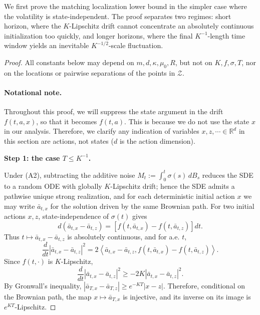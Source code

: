 \documentclass{article}
\newcommand{\1}{\mathbbm{1}}
\numberwithin{equation}{section}
\begin{document}
We first prove the matching localization lower bound in the simpler case where the volatility is state-independent. The proof separates two regimes: short horizon, where the \(K\)-Lipschitz drift cannot concentrate an absolutely continuous initialization too quickly, and longer horizons, where the final \(K^{-1}\)-length time window yields an inevitable \(K^{-1/2}\)-scale fluctuation.

\begin{proof}
All constants below may depend on $m,d,\kappa,\mu_0,R$, but not on
$K,f,\sigma,T$, nor on the locations or pairwise separations of the points
in $\mathcal{Z}$.

\paragraph{Notational note.} Throughout this proof, we will suppress the state argument in the drift $f(t, a, x)$, so that it becomes $f(t, a)$. This is because we do not use the state $x$ in our analysis. Therefore, we clarify any indication of variables $x, z,\cdots \in \mathbb{R}^{d}$ in this section are actions, not states ($d$ is the action dimension).

\medskip



\textbf{Step 1: the case \(T\le K^{-1}\).}

Under (A2), subtracting the additive noise
\(M_t:=\int_0^t \sigma(s)\,dB_s\) reduces the SDE to a random ODE with
globally \(K\)-Lipschitz drift; hence the SDE admits a pathwise unique
strong realization, and for each deterministic initial action \(x\) we may
write \(\bar a_{t,x}\) for the solution driven by the same Brownian path. For two
initial actions \(x,z\), state-independence of \(\sigma(t)\) gives
\[
d(\bar a_{t,x}-\bar a_{t,z})
=
\left[f(t,\bar a_{t,x})-f(t,\bar a_{t,z})\right]dt.
\]
Thus \(t\mapsto \bar a_{t,x}-\bar a_{t,z}\) is absolutely continuous, and
for a.e. \(t\),
\[
\frac{d}{dt}|\bar a_{t,x}-\bar a_{t,z}|^2
=
2\left\langle
\bar a_{t,x}-\bar a_{t,z},
f(t,\bar a_{t,x})-f(t,\bar a_{t,z})
\right\rangle.
\]
Since \(f(t,\cdot)\) is \(K\)-Lipschitz,
\[
\frac{d}{dt}|\bar a_{t,x}-\bar a_{t,z}|^2
\ge
-2K|\bar a_{t,x}-\bar a_{t,z}|^2 .
\]
By Gronwall's inequality,
$
|\bar a_{T,x}-\bar a_{T,z}|
\ge
e^{-KT}|x-z|.
$ Therefore, conditional on the Brownian path, the map
\(x\mapsto \bar a_{T,x}\) is injective, and its inverse on its image is
\(e^{KT}\)-Lipschitz.


\end{proof}
\end{document}
